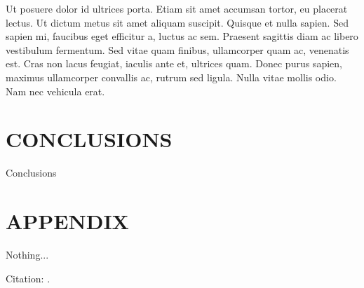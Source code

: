 \documentclass[letterpaper, 10 pt, conference]{ieeeconf}  %
\begin{document}
  Ut posuere dolor id ultrices porta. Etiam sit amet accumsan tortor, eu placerat lectus. Ut dictum metus sit amet aliquam suscipit. Quisque et nulla sapien. Sed sapien mi, faucibus eget efficitur a, luctus ac sem. Praesent sagittis diam ac libero vestibulum fermentum. Sed vitae quam finibus, ullamcorper quam ac, venenatis est. Cras non lacus feugiat, iaculis ante et, ultrices quam. Donec purus sapien, maximus ullamcorper convallis ac, rutrum sed ligula. Nulla vitae mollis odio. Nam nec vehicula erat. 


\section{CONCLUSIONS}\label{s:conclusions}

Conclusions

\addtolength{\textheight}{-12cm}   %

\section*{APPENDIX}

Nothing...

Citation: \cite{IEEEexample:article_typical}.


\balance

\makeatletter
\def\endthebibliography{%
	\def\@noitemerr{\@latex@warning{Empty `thebibliography' environment}}%
	\endlist
}
\makeatother



\end{document}
